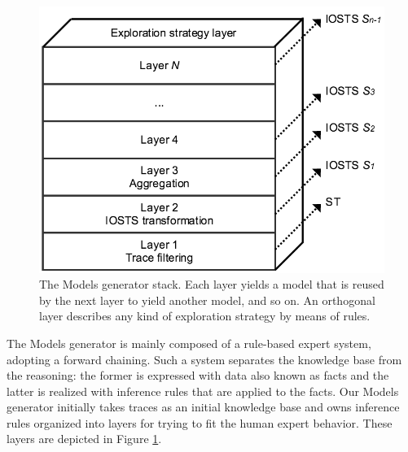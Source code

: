 \begin{figure}[ht]
    \begin{center}
        \includegraphics[width=1.0\linewidth]{figures/soict_se.png}
    \end{center}

    \caption {The Models generator stack. Each layer yields a
    model that is reused by the next layer to yield another
    model, and so on. An orthogonal layer describes any kind of
    exploration strategy by means of rules.}
    \label{fig:se}
\end{figure}

The Models generator is mainly composed of a rule-based expert
system, adopting a forward chaining. Such a system separates the
knowledge base from the reasoning: the former is expressed with
data also known as facts and the latter is realized with
inference rules that are applied to the facts. Our Models
generator initially takes traces as an initial knowledge base and
owns inference rules organized into layers for trying to fit the
human expert behavior. These layers are depicted in Figure
\ref{fig:se}.

